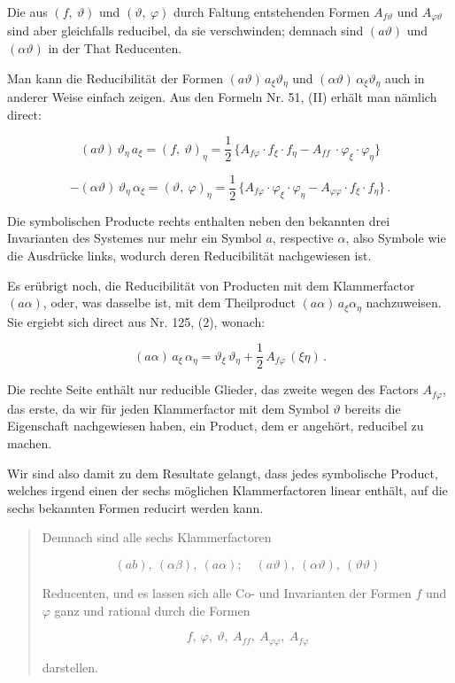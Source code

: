 Die aus $(f,\ \vartheta)$ und $(\vartheta,\ \varphi)$ durch Faltung entstehenden Formen
$A_{f\vartheta}$ und $A_{\varphi\vartheta}$ sind aber gleichfalls reducibel, da sie verschwinden;
demnach sind $(a\vartheta)$ und $(\alpha\vartheta)$ in der That Reducenten.

Man kann die Reducibilität der Formen $(a\vartheta)\,a_\xi\vartheta_\eta$ und $(\alpha\vartheta)\,\alpha_\xi\vartheta_\eta$
auch in anderer Weise einfach zeigen. Aus den Formeln Nr. 51, (II)
erhält man nämlich direct:

\[
(a\vartheta)\,\vartheta_\eta\,a_\xi = (f,\ \vartheta)_\eta = \frac{1}{2}\,\{A_{f\varphi}\cdot f_\xi\cdot f_\eta - A_{ff}\ \cdot\varphi_\xi\cdot\varphi_\eta\}
\]

\[
-(\alpha\vartheta)\,\vartheta_\eta\,\alpha_\xi = (\vartheta,\ \varphi)_\eta = \frac{1}{2}\,\{A_{f\varphi}\cdot\varphi_\xi\cdot\varphi_\eta - A_{\varphi\varphi}\cdot f_\xi\cdot f_\eta\}\,.
\]

Die symbolischen Producte rechts enthalten neben den bekannten
drei Invarianten des Systemes nur mehr ein Symbol $a$, respective
$\alpha$, also  Symbole wie die Ausdrücke links, wodurch deren
Reducibilität nachgewiesen ist.

Es erübrigt noch, die Reducibilität von Producten mit dem Klammerfactor $(a\alpha)$, oder, was dasselbe ist, mit dem Theilproduct $(a\alpha)\,a_\xi\alpha_\eta$
nachzuweisen. Sie ergiebt sich direct aus Nr. 125, (2), wonach:

\[
(a\alpha)\,a_\xi\,\alpha_\eta = \vartheta_\xi\,\vartheta_\eta + \frac{1}{2}\,A_{f\varphi}\,(\xi\eta)\,.
\]



Die rechte Seite enthält nur reducible Glieder, das zweite wegen
des Factors $A_{f\varphi}$, das erste, da wir für jeden Klammerfactor mit dem
Symbol $\vartheta$ bereits die Eigenschaft nachgewiesen haben, ein Product,
dem er angehört, reducibel zu machen.

Wir sind also damit zu dem Resultate gelangt, dass jedes symbolische Product, welches irgend einen der sechs möglichen Klammerfactoren linear enthält, auf die sechs bekannten Formen reducirt
werden kann.

\begin{quote}
\glqq Demnach sind alle sechs Klammerfactoren

\[
(ab),\ (\alpha\beta),\ (a\alpha);\quad (a\vartheta),\ (\alpha\vartheta),\ (\vartheta\vartheta)
\]

Reducenten, und es lassen sich alle Co- und Invarianten der
Formen $f$ und $\varphi$ ganz und rational durch die Formen

\[
f,\ \varphi,\ \vartheta,\ A_{ff},\ A_{\varphi\varphi},\ A_{f\varphi}
\]

darstellen.\grqq{}
\end{quote}

